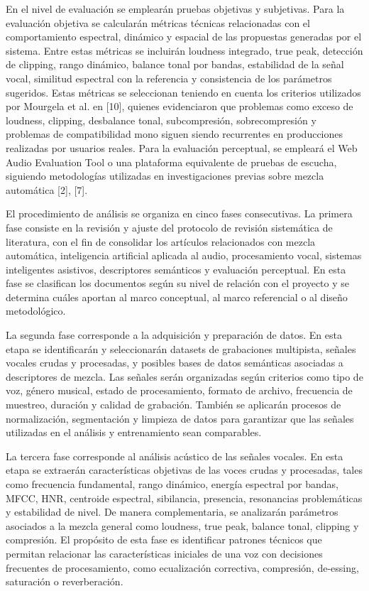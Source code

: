 En el nivel de evaluación se emplearán pruebas objetivas y subjetivas. Para la evaluación objetiva se calcularán métricas técnicas relacionadas con el comportamiento espectral, dinámico y espacial de las propuestas generadas por el sistema. Entre estas métricas se incluirán loudness integrado, true peak, detección de clipping, rango dinámico, balance tonal por bandas, estabilidad de la señal vocal, similitud espectral con la referencia y consistencia de los parámetros sugeridos. Estas métricas se seleccionan teniendo en cuenta los criterios utilizados por Mourgela et al. en [10], quienes evidenciaron que problemas como exceso de loudness, clipping, desbalance tonal, subcompresión, sobrecompresión y problemas de compatibilidad mono siguen siendo recurrentes en producciones realizadas por usuarios reales. Para la evaluación perceptual, se empleará el Web Audio Evaluation Tool o una plataforma equivalente de pruebas de escucha, siguiendo metodologías utilizadas en investigaciones previas sobre mezcla automática [2], [7].

El procedimiento de análisis se organiza en cinco fases consecutivas. La primera fase consiste en la revisión y ajuste del protocolo de revisión sistemática de literatura, con el fin de consolidar los artículos relacionados con mezcla automática, inteligencia artificial aplicada al audio, procesamiento vocal, sistemas inteligentes asistivos, descriptores semánticos y evaluación perceptual. En esta fase se clasifican los documentos según su nivel de relación con el proyecto y se determina cuáles aportan al marco conceptual, al marco referencial o al diseño metodológico.

La segunda fase corresponde a la adquisición y preparación de datos. En esta etapa se identificarán y seleccionarán datasets de grabaciones multipista, señales vocales crudas y procesadas, y posibles bases de datos semánticas asociadas a descriptores de mezcla. Las señales serán organizadas según criterios como tipo de voz, género musical, estado de procesamiento, formato de archivo, frecuencia de muestreo, duración y calidad de grabación. También se aplicarán procesos de normalización, segmentación y limpieza de datos para garantizar que las señales utilizadas en el análisis y entrenamiento sean comparables.

La tercera fase corresponde al análisis acústico de las señales vocales. En esta etapa se extraerán características objetivas de las voces crudas y procesadas, tales como frecuencia fundamental, rango dinámico, energía espectral por bandas, MFCC, HNR, centroide espectral, sibilancia, presencia, resonancias problemáticas y estabilidad de nivel. De manera complementaria, se analizarán parámetros asociados a la mezcla general como loudness, true peak, balance tonal, clipping y compresión. El propósito de esta fase es identificar patrones técnicos que permitan relacionar las características iniciales de una voz con decisiones frecuentes de procesamiento, como ecualización correctiva, compresión, de-essing, saturación o reverberación.

